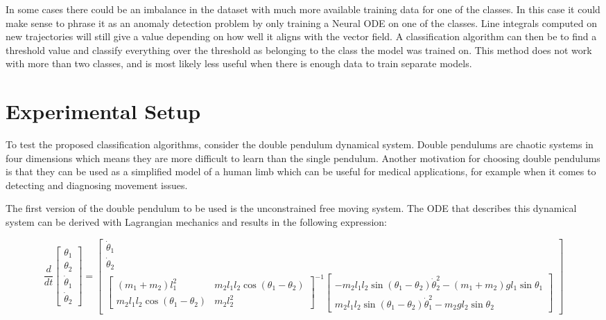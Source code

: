 \documentclass[12pt,a4paper]{book}
\begin{document}
In some cases there could be an imbalance in the dataset with much more available training data for one of the classes. In this case it could make sense to phrase it as an anomaly detection problem by only training a Neural ODE on one of the classes. Line integrals computed on new trajectories will still give a value depending on how well it aligns with the vector field. A classification algorithm can then be to find a threshold value and classify everything over the threshold as belonging to the class the model was trained on. This method does not work with more than two classes, and is most likely less useful when there is enough data to train separate models.

\section{Experimental Setup}

To test the proposed classification algorithms, consider the double pendulum dynamical system. Double pendulums are chaotic systems in four dimensions which means they are more difficult to learn than the single pendulum. Another motivation for choosing double pendulums is that they can be used as a simplified model of a human limb which can be useful for medical applications, for example when it comes to detecting and diagnosing movement issues.

The first version of the double pendulum to be used is the unconstrained free moving system. The ODE that describes this dynamical system can be derived with Lagrangian mechanics and results in the following expression:

\begin{adjustwidth}{-2cm}{-2cm}
    \begin{equation}
        \frac{d}{d t} \begin{bmatrix} \theta_1 \\ \theta_2 \\ \dot{\theta}_1 \\ \dot{\theta}_2 \end{bmatrix}
        = \begin{bmatrix}
            \dot{\theta}_1 \\ \dot{\theta}_2 \\ 
            \begin{bmatrix}
                (m_1 + m_2) l_1^2 & m_2 l_1 l_2 \cos(\theta_1 - \theta_2) \\
                m_2 l_1 l_2 \cos(\theta_1 - \theta_2) & m_2 l_2^2
            \end{bmatrix}^{-1}
            \begin{bmatrix} -m_2 l_1 l_2 \sin(\theta_1 - \theta_2) \dot{\theta}_2^2 - (m_1 + m_2) g l_1 \sin{\theta_1} \\ m_2 l_1 l_2 \sin(\theta_1 - \theta_2) \dot{\theta}_1^2 - m_2 g l_2 \sin{\theta_2}\end{bmatrix}
        \end{bmatrix}
        \label{eq:doublependulumequation}
    \end{equation}
\end{adjustwidth}
\end{document}
